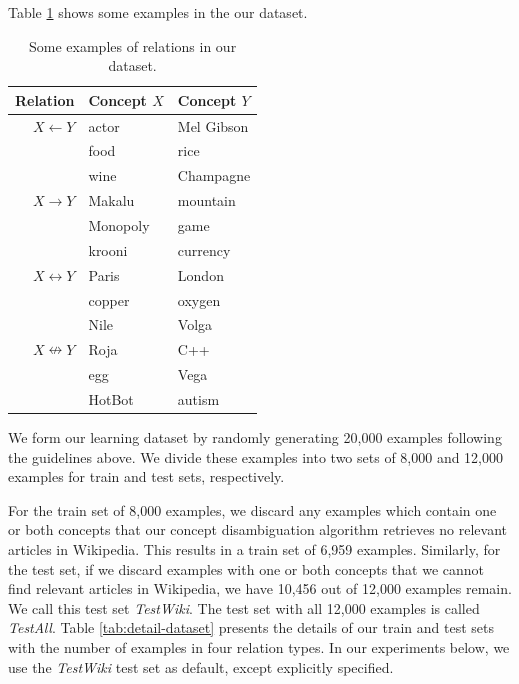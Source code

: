 Table \ref{table:examples} shows some examples in the our dataset.

\begin{table}[h]
  \centering
  \begin{tabular}{|r|l|l|}
    \hline
    {\bf Relation}          & {\bf Concept $X$} & {\bf Concept $Y$}    \\
    \hline
    \hline
    $X \leftarrow Y$        & actor             & Mel Gibson           \\
    & food              & rice                 \\
    & wine              & Champagne            \\
    \hline                               
    $X \rightarrow Y$       & Makalu            & mountain             \\
    & Monopoly          & game                 \\
    & krooni            & currency             \\
    \hline                               
    $X \leftrightarrow Y$   & Paris             & London               \\
    & copper            & oxygen                \\
    & Nile              & Volga                 \\
    \hline                               
    $X \nleftrightarrow Y$ & Roja              & C++                  \\
    & egg               & Vega                  \\
    & HotBot            & autism                \\
    \hline
  \end{tabular}
  \caption{Some examples of relations in our dataset.}
  \label{table:examples}
\end{table}

We form our learning dataset by randomly generating 20,000 examples
following the guidelines above. We divide these examples into two sets
of 8,000 and 12,000 examples for train and test sets, respectively.

For the train set of 8,000 examples, we discard any examples which
contain one or both concepts that our concept disambiguation algorithm
retrieves no relevant articles in Wikipedia. This results in a train
set of 6,959 examples. Similarly, for the test set, if we discard
examples with one or both concepts that we cannot find relevant
articles in Wikipedia, we have 10,456 out of 12,000 examples
remain. We call this test set {\em TestWiki}. The test set with all
12,000 examples is called {\em TestAll}. Table
\ref{tab:detail-dataset} presents the details of our train and test
sets with the number of examples in four relation types. In our
experiments below, we use the {\em TestWiki} test set as default,
except explicitly specified.

